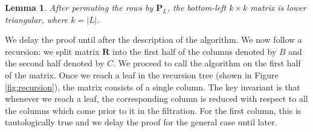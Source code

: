 \documentclass[10pt,a4paper]{article}
\newtheorem{lemma}[theorem]{Lemma}
\newcommand{\matsize}[2]{#1\times #2}
\newcommand{\mat}[1]{\mathbf{#1}}
\begin{document}
\begin{lemma}\label{lem:triangular}
    After permuting the rows by $\mat{P}_L$, the bottom-left $\matsize{k}{k}$ matrix is lower triangular, where $k = |L|$.
\end{lemma}
We delay the proof until after the description of the algorithm.  We now follow a recursion: we split matrix $\mat{R}$ into  the
first half of the columns denoted by $B$ and the second half denoted by $C$. We proceed to call the
algorithm on the first half of the matrix. Once we reach a leaf in the
recursion tree (shown in Figure \ref{fig:recursion}), the matrix consists of a single column. The key invariant is that whenever we
reach a leaf, the corresponding column is reduced with respect to all the columns which come prior to
it in the filtration. For the first column, this is tautologically true and we delay the proof for the general case until later.
%
\end{document}
